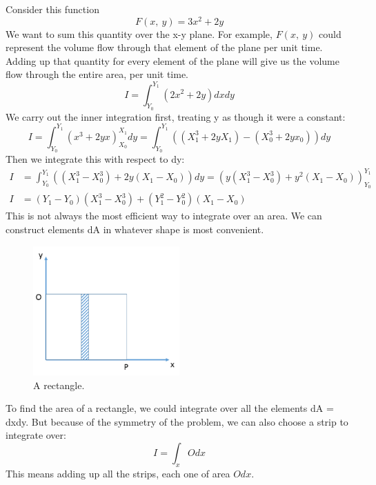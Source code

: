 \documentclass[class=report, crop=false, 12pt,a4paper]{standalone}
\begin{document}
Consider this function
\begin{equation}
  F(x, \ y) = 3x^2 + 2y
\end{equation}
We want to sum this quantity over the x-y plane. For example, $F(x,\ y)$ could represent the volume flow through that element of the plane per unit time. Adding up that quantity for every element of the plane will give us the volume flow through the entire area, per unit time.
\begin{equation}
  I = \int_{Y_0}^{Y_1}(2x^2 + 2y)dxdy
\end{equation}
We carry out the inner integration first, treating y as though it were a constant:
\begin{equation}
  I = \int^{Y_1}_{Y_0}\left(x^3 + 2yx \right)^{X_1}_{X_0} dy = \int_{Y_0}^{Y_1} \left( (X^3_1 +2yX_1) - (X^3_0 + 2yx_0) \right) dy
\end{equation}
Then we integrate this with respect to dy:
\begin{align}
  I &= \int_{Y_0}^{Y_1} \left( (X^3_1 - X^3_0) + 2y(X_1 - X_0) \right) dy = \left( y(X^3_1 - X^3_0) + y^2(X_1 - X_0) \right)^{Y_1}_{Y_0}\\
  I &= (Y_1 - Y_0)(X^3_1 - X^3_0) + (Y^2_1 - Y^2_0)(X_1 - X_0)
\end{align}
This is not always the most efficient way to integrate over an area. We can construct elements dA in whatever shape is most convenient.
\begin{figure}
  \centering
  \includegraphics[width = 0.5\textwidth]{../img/areaofrectangle}
  \caption{A rectangle.}
\end{figure}
To find the area of a rectangle, we could integrate over all the elements dA = dxdy.
But because of the symmetry of the problem, we can also choose a strip to integrate over:
\begin{equation}
  I = \int_x O dx
\end{equation}
This means adding up all the strips, each one of area $O dx$.
\end{document}
